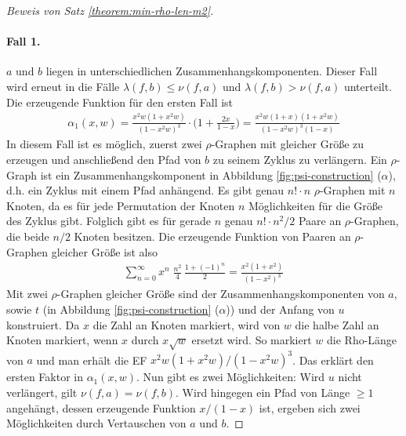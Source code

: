 \documentclass[a4paper, 10pt, ngerman]{article}
\begin{document}
\begin{proof}[Beweis von Satz \ref{theorem:min-rho-len-m2}]
        \paragraph{Fall 1.} $a$ und $b$ liegen in unterschiedlichen Zusammenhangskomponenten. Dieser Fall wird erneut in die Fälle $\lambda(f, b) \le \nu(f, a)$ und $\lambda(f, b) > \nu(f, a)$ unterteilt. Die erzeugende Funktion für den ersten Fall ist
        \begin{align*}
            \alpha_1(x, w) = \frac {x^2w(1 + x^2w)} {(1 - x^2w)^3} \cdot \Bigg (1 + \frac {2x} {1 - x} \Bigg ) = \frac {x^2w(1 + x)(1 + x^2w)} {(1 - x^2w)^3(1 - x)}
        \end{align*}
        In diesem Fall ist es möglich, zuerst zwei $\rho$-Graphen mit gleicher Größe zu erzeugen und anschließend den Pfad von $b$ zu seinem Zyklus zu verlängern. Ein $\rho$-Graph ist ein Zusammenhangskomponent in Abbildung \ref{fig:psi-construction} ($\alpha$), d.h. ein Zyklus mit einem Pfad anhängend. Es gibt genau $n! \cdot n$ $\rho$-Graphen mit $n$ Knoten, da es für jede Permutation der Knoten $n$ Möglichkeiten für die Größe des Zyklus gibt. Folglich gibt es für gerade $n$ genau $n! \cdot n^2/2$ Paare an $\rho$-Graphen, die beide $n/2$ Knoten besitzen. Die erzeugende Funktion von Paaren an $\rho$-Graphen gleicher Größe ist also
        \begin{align*}
            \sum_{n = 0}^\infty x^n \; \frac {n^2} 4 \, \frac {1 + (-1)^n} 2
            = \frac {x^2(1 + x^2)} {(1 - x^2)^3}
        \end{align*}
        Mit zwei $\rho$-Graphen gleicher Größe sind der Zusammenhangskomponenten von $a$, sowie $t$ (in Abbildung \ref{fig:psi-construction} ($\alpha$)) und der Anfang von $u$ konstruiert. Da $x$ die Zahl an Knoten markiert, wird von $w$ die halbe Zahl an Knoten markiert, wenn $x$ durch $x \sqrt w$ ersetzt wird. So markiert $w$ die Rho-Länge von $a$ und man erhält die EF $x^2w(1 + x^2w) / (1 - x^2w)^3$. Das erklärt den ersten Faktor in $\alpha_1(x, w)$. Nun gibt es zwei Möglichkeiten: Wird $u$ nicht verlängert, gilt $\nu(f, a) = \nu(f, b)$. Wird hingegen ein Pfad von Länge $\ge 1$ angehängt, dessen erzeugende Funktion $x/(1 - x)$ ist, ergeben sich zwei Möglichkeiten durch Vertauschen von $a$ und $b$.


\end{proof}
\end{document}
